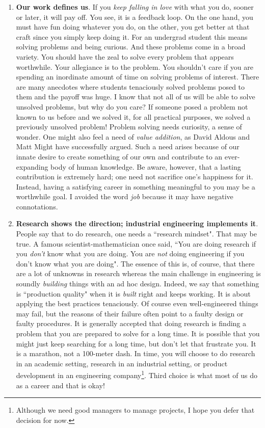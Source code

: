 \documentclass[a6paper]{article}
\begin{document}
\begin{enumerate}
    \item \textbf{Our work defines us}. If you \emph{keep falling in love} with what you do, sooner or later, it will pay off. You see, it is a feedback loop. On the one hand, you must have fun doing whatever you do, on the other, you get better at that craft since you simply keep doing it. For an undergrad student this means solving problems and being curious. And these problems come in a broad variety. You should have the zeal to solve every problem that appears worthwhile. Your allegiance is to the problem. You shouldn't care if you are spending an inordinate amount of time on solving problems of interest. There are many anecdotes where students tenaciously solved problems posed to them and the payoff was huge. I know that not all of us will be able to solve unsolved problems, but why do you care? If someone posed a problem not known to us before and we solved it, for all practical purposes, we solved a previously unsolved problem! Problem solving needs curiosity, a sense of wonder. One might also feel a need of \emph{value addition}, as David Aldous \cite{david} and Matt Might \cite{matt} have successfully argued. Such a need arises because of our innate desire to create something of our own and contribute to an ever-expanding body of human knowledge. Be aware, however, that a lasting contribution is extremely hard; one need not sacrifice one's happiness for it. Instead, having a satisfying career in something meaningful to you may be a worthwhile goal. I avoided the word \emph{job} because it may have negative connotations.
    \item \textbf{Research shows the direction; industrial engineering implements it}. People say that to do research, one needs a ``research mindset". That may be true. A famous scientist-mathematician \cite{hamming} once said, ``You are doing research if you \emph{don't} know what you are doing. You are \emph{not} doing engineering if you don't know what you are doing". The essence of this is, of course, that there are a lot of unknowns in research whereas the main challenge in engineering is soundly \emph{building} things with an ad hoc design. Indeed, we say that something is ``production quality" when it is \emph{built} right and keeps working. It is about applying the best practices tenaciously. Of course even well-engineered things may fail, but the reasons of their failure often point to a faulty design or faulty procedures.  It is generally accepted that doing research is finding a problem that you are prepared to solve for a long time. It is possible that you might just keep searching for a long time, but don't let that frustrate you. It is a marathon, not a 100-meter dash. In time, you will choose to do research in an academic setting, research in an industrial setting, or product development in an engineering company\footnote{Although we need good managers to manage projects, I hope you defer that decision for now.}. Third choice is what most of us do as a career and that is okay!

\end{enumerate}
\end{document}
